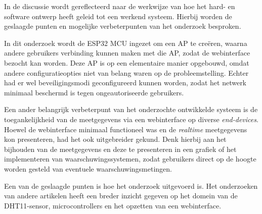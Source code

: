 In de discussie wordt gereflecteerd naar de werkwijze van hoe het hard- en software ontwerp heeft geleid tot een werkend systeem. 
Hierbij worden de geslaagde punten en mogelijke verbeterpunten van het onderzoek besproken. 

In dit onderzoek wordt de ESP32 MCU ingezet om een AP te creëren, waarna andere gebruikers verbinding kunnen maken met die AP, zodat de webinterface bezocht kan worden. 
Deze AP is op een elementaire manier opgebouwd, omdat andere configuratieopties niet van belang waren op de probleemstelling. 
Echter had er wel beveiligingsmodi geconfigureerd kunnen worden, zodat het netwerk minimaal beschermd is tegen ongeautoriseerde gebruikers. 

Een ander belangrijk verbeterpunt van het onderzochte ontwikkelde systeem is de toegankelijkheid van de meetgegevens via een webinterface op diverse \textit{end-devices}. 
Hoewel de webinterface minimaal functioneel was en de \textit{realtime} meetgegevens kon presenteren, had het ook uitgebreider gekund. 
Denk hierbij aan het bijhouden van de meetgegevens en deze te presenteren in een grafiek of het implementeren van waarschuwingssystemen, 
zodat gebruikers direct op de hoogte worden gesteld van eventuele waarschuwingsmetingen. 

Een van de geslaagde punten is hoe het onderzoek uitgevoerd is. 
Het onderzoeken van andere artikelen heeft een breder inzicht gegeven op het domein van de DHT11-sensor, microcontrollers en het opzetten van een webinterface. 
